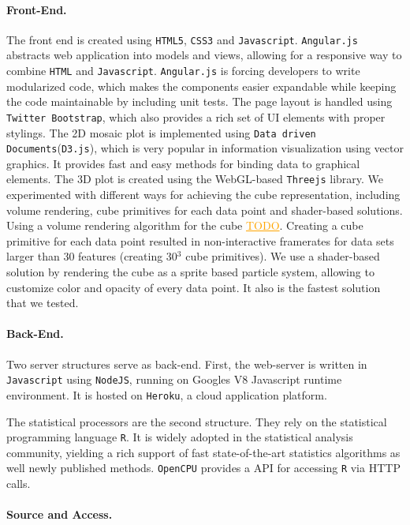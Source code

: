 \documentclass[journal]{style/vgtc} 			          %
\newcommand{\com}[1]{\textcolor{orange}{\uline{#1}}}
\begin{document}
\paragraph{Front-End.}
The front end is created using \texttt{HTML5}, \texttt{CSS3} and \texttt{Javascript}.
\texttt{Angular.js} abstracts web application into models and views, allowing for a responsive way to combine \texttt{HTML} and \texttt{Javascript}.
\texttt{Angular.js} is forcing developers to write modularized code, which makes the components easier expandable while keeping the code maintainable by including unit tests.
The page layout is handled using \texttt{Twitter Bootstrap}, which also provides a rich set of UI elements with proper stylings.
The 2D mosaic plot is implemented using \texttt{Data driven Documents}(\texttt{D3.js}), which is very popular in information visualization using vector graphics.
It provides fast and easy methods for binding data to graphical elements.
The 3D plot is created using the WebGL-based \texttt{Threejs} library.
We experimented with different ways for achieving the cube representation, including volume rendering, cube primitives for each data point and shader-based solutions.
Using a volume rendering algorithm for the cube \com{TODO}.
Creating a cube primitive for each data point resulted in non-interactive framerates for data sets larger than 30 features (creating 30$^3$ cube primitives).
We use a shader-based solution by rendering the cube as a sprite based particle system, allowing to customize color and opacity of every data point.
It also is the fastest solution that we tested.

\paragraph{Back-End.}
Two server structures serve as back-end.
First, the web-server is written in \texttt{Javascript} using \texttt{NodeJS}, running on Googles V8 Javascript runtime environment.
It is hosted on \texttt{Heroku}, a cloud application platform.

The statistical processors are the second structure.
They rely on the statistical programming language \texttt{R}.
It is widely adopted in the statistical analysis community, yielding a rich support of fast state-of-the-art statistics algorithms as well newly published methods.
\texttt{OpenCPU} provides a API for accessing \texttt{R} via HTTP calls.

\paragraph{Source and Access.}
\end{document}
